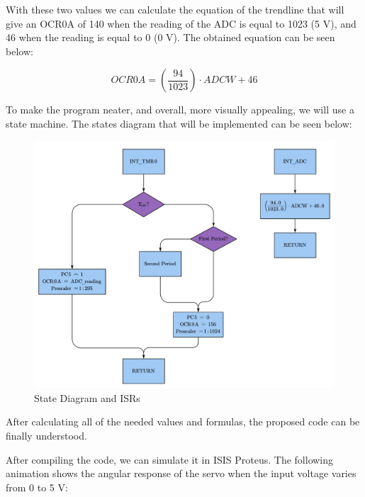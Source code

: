 With these two values we can calculate the equation of the trendline that will give an OCR0A of 140 when the reading of the ADC is equal to 1023 (5 V), and 46 when the reading is equal to 0 (0 V). The obtained equation can be seen below:

\begin{equation*}
    OCR0A = \left( \dfrac{94}{1023} \right) \cdot ADCW + 46
\end{equation*}

\clearpage

To make the program neater, and overall, more visually appealing, we will use a state machine. The states diagram that will be implemented can be seen below:

\begin{figure}[H]
    \centering
    \includegraphics[width = \textwidth]{Graphics/MICROS/Practice 4/STATE_DIAGRAM_TOTAL.pdf}
    \caption{State Diagram and ISRs}
    \label{fig:STATE_DIAG_ISR}
\end{figure}


After calculating all of the needed values and formulas, the proposed code can be finally understood.



After compiling the code, we can simulate it in ISIS Proteus. The following animation shows the angular response of the servo when the input voltage varies from 0 to 5 V:


